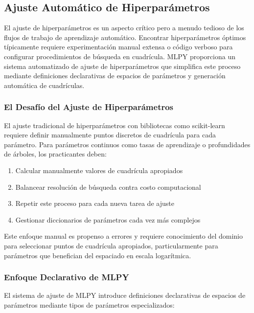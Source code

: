 \subsection{Ajuste Automático de Hiperparámetros}
\label{sec:automl_tuning}

El ajuste de hiperparámetros es un aspecto crítico pero a menudo tedioso de los flujos de trabajo de aprendizaje automático. Encontrar hiperparámetros óptimos típicamente requiere experimentación manual extensa o código verboso para configurar procedimientos de búsqueda en cuadrícula. MLPY proporciona un sistema automatizado de ajuste de hiperparámetros que simplifica este proceso mediante definiciones declarativas de espacios de parámetros y generación automática de cuadrículas.

\subsubsection{El Desafío del Ajuste de Hiperparámetros}

El ajuste tradicional de hiperparámetros con bibliotecas como scikit-learn requiere definir manualmente puntos discretos de cuadrícula para cada parámetro. Para parámetros continuos como tasas de aprendizaje o profundidades de árboles, los practicantes deben:

\begin{enumerate}
    \item Calcular manualmente valores de cuadrícula apropiados
    \item Balancear resolución de búsqueda contra costo computacional
    \item Repetir este proceso para cada nueva tarea de ajuste
    \item Gestionar diccionarios de parámetros cada vez más complejos
\end{enumerate}

Este enfoque manual es propenso a errores y requiere conocimiento del dominio para seleccionar puntos de cuadrícula apropiados, particularmente para parámetros que benefician del espaciado en escala logarítmica.

\subsubsection{Enfoque Declarativo de MLPY}

El sistema de ajuste de MLPY introduce definiciones declarativas de espacios de parámetros mediante tipos de parámetros especializados:


